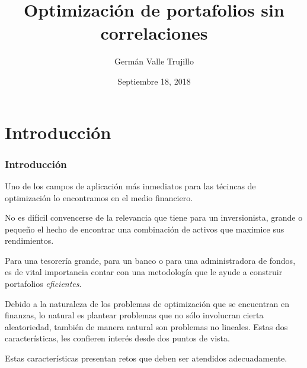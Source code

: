 \documentclass{beamer}
\title[Optimización sin correlaciones]{Optimización de portafolios sin correlaciones}
\author{Germán Valle Trujillo}
\institute{Facultad dde Ciencias, UNAM.}
\date[L24H :: 18-09-2018]{Septiembre 18, 2018}
\begin{document}
    \frame[plain]{\titlepage}
    \section[Introducción]{Introducción}
    \begin{frame}
        \frametitle{Introducción}
        Uno de los campos de aplicación más inmediatos para las técincas de optimización lo encontramos en el medio financiero. 
    \par\medskip
        No es difícil convencerse de la relevancia que tiene para un inversionista, grande o pequeño el hecho de encontrar una combinación de activos que maximice sus rendimientos.
    \par\medskip
        Para una tesorería grande, para un banco o para una administradora de fondos, es de vital importancia contar con una metodología que le ayude a construir portafolios \emph{eficientes}.
    \end{frame}
    \begin{frame}   
    Debido a la naturaleza de los problemas de optimización que se encuentran en finanzas, lo natural es plantear problemas que no sólo involucran cierta aleatoriedad, también de manera natural son problemas no lineales. Estas dos características, les confieren interés desde dos puntos de vista.
    \par\medskip
    Estas características presentan retos que deben ser atendidos adecuadamente.
    \end{frame}
\end{document}
